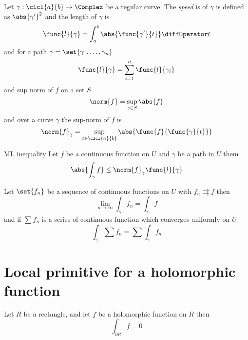 Let \(\gamma:\clcl{a}{b} \to \Complex\) be a regular curve. The \textit{speed} is of \(\gamma\) is defined as \(\abs{\gamma'}^2\) and the length of \(\gamma\) is 
\begin{equation*}
    \func{l}{\gamma} = \int_{a}^b \abs{\func{\gamma'}{t}} \diffOperator t
\end{equation*}
and for a path \(\gamma = \set{\gamma_1, \dots , \gamma_n}\) 
\begin{equation*}
    \func{l}{\gamma} = \sum_{i = 1}^n \func{l}{\gamma_i}
\end{equation*}
and sup norm of \(f\) on a set \(S\) 
\begin{equation*}
    \norm{f} = \sup_{z \in S} \abs{f}
\end{equation*}
and over a curve \(\gamma\) the sup-norm of \(f\) is 
\begin{equation*}
    \norm{f}_{\gamma} = \sup_{t \in \clcl{a}{b}} \abs{\func{f}{\func{\gamma}{t}}}
\end{equation*}

\begin{proposition}{ML inequality}
    Let \(f\) be a continuous function on \(U\) and \(\gamma\) be a path in \(U\) them 
    \begin{equation*}
        \abs{\int_{\gamma} f} \leq \norm{f}_{\gamma} \func{l}{\gamma}
    \end{equation*}
\end{proposition}

\begin{theorem}
    Let \(\set{f_n}\) be a sequence of continuous functions on \(U\) with \(f_n \rightrightarrows f\) then 
    \begin{equation*}
        \lim_{n \to \infty} \int_{\gamma} f_n = \int_{\gamma} f
    \end{equation*}
    and if \(\sum f_n\) is a series of continuous function which converges uniformly on \(U\)
    \begin{equation*}
        \int_{\gamma} \sum f_n = \sum \int_{\gamma} f_n
    \end{equation*}
\end{theorem}

\section{Local primitive for a holomorphic function}
\begin{theorem}[Goursat]
    Let \(R\) be a rectangle, and let \(f\) be a holomorphic function on \(R\) then 
    \begin{equation*}
        \int_{\partial R} f = 0
    \end{equation*}
\end{theorem}

